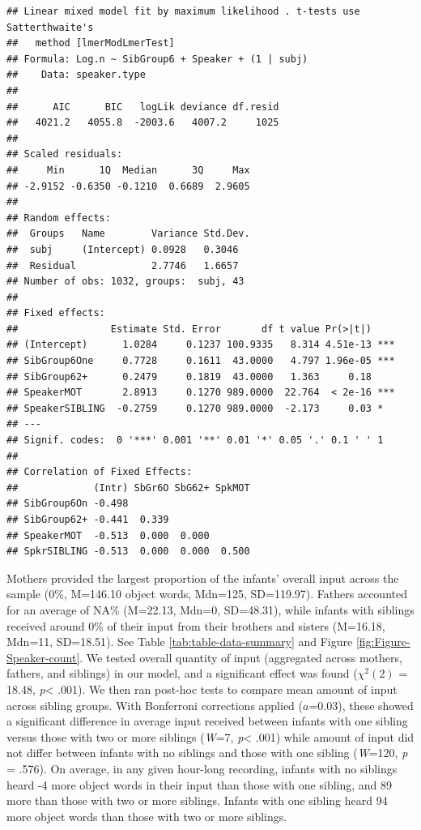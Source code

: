 \documentclass[
  english,
  man,floatsintext]{apa6}
\begin{document}
\begin{verbatim}
## Linear mixed model fit by maximum likelihood . t-tests use Satterthwaite's
##   method [lmerModLmerTest]
## Formula: Log.n ~ SibGroup6 + Speaker + (1 | subj)
##    Data: speaker.type
## 
##      AIC      BIC   logLik deviance df.resid 
##   4021.2   4055.8  -2003.6   4007.2     1025 
## 
## Scaled residuals: 
##     Min      1Q  Median      3Q     Max 
## -2.9152 -0.6350 -0.1210  0.6689  2.9605 
## 
## Random effects:
##  Groups   Name        Variance Std.Dev.
##  subj     (Intercept) 0.0928   0.3046  
##  Residual             2.7746   1.6657  
## Number of obs: 1032, groups:  subj, 43
## 
## Fixed effects:
##                Estimate Std. Error       df t value Pr(>|t|)    
## (Intercept)      1.0284     0.1237 100.9335   8.314 4.51e-13 ***
## SibGroup6One     0.7728     0.1611  43.0000   4.797 1.96e-05 ***
## SibGroup62+      0.2479     0.1819  43.0000   1.363     0.18    
## SpeakerMOT       2.8913     0.1270 989.0000  22.764  < 2e-16 ***
## SpeakerSIBLING  -0.2759     0.1270 989.0000  -2.173     0.03 *  
## ---
## Signif. codes:  0 '***' 0.001 '**' 0.01 '*' 0.05 '.' 0.1 ' ' 1
## 
## Correlation of Fixed Effects:
##             (Intr) SbGr6O SbG62+ SpkMOT
## SibGroup6On -0.498                     
## SibGroup62+ -0.441  0.339              
## SpeakerMOT  -0.513  0.000  0.000       
## SpkrSIBLING -0.513  0.000  0.000  0.500
\end{verbatim}

Mothers provided the largest proportion of the infants' overall input across the sample (0\%, M=146.10 object words, Mdn=125, SD=119.97). Fathers accounted for an average of NA\% (M=22.13, Mdn=0, SD=48.31), while infants with siblings received around 0\% of their input from their brothers and sisters (M=16.18, Mdn=11, SD=18.51). See Table \ref{tab:table-data-summary} and Figure \ref{fig:Figure-Speaker-count}. We tested overall quantity of input (aggregated across mothers, fathers, and siblings) in our model, and a significant effect was found (\(\chi^2 (2)\) = 18.48, \emph{p}\textless{} .001). We then ran post-hoc tests to compare mean amount of input across sibling groups. With Bonferroni corrections applied (\(a\)=0.03), these showed a significant difference in average input received between infants with one sibling versus those with two
or more siblings (\emph{W}=7, \emph{p}\textless{} .001) while amount of input did not differ between infants with no siblings and those with one sibling (\emph{W}=120, \emph{p} = .576). On average, in any given hour-long recording, infants with no siblings heard -4 more object words in their input than those with one sibling, and 89 more than those with two or more siblings. Infants with one sibling heard 94 more object words than those with two or more siblings.
\end{document}
